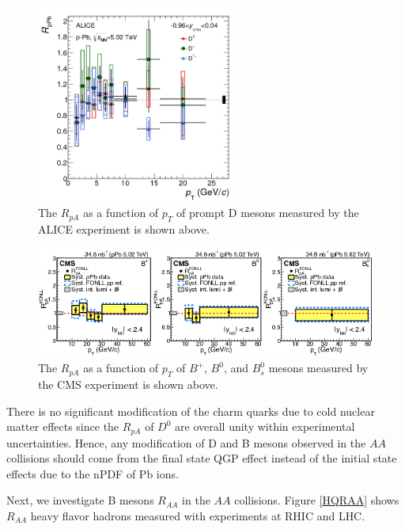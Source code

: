 \begin{figure}[hbtp]
\begin{center}
\includegraphics[width=0.60\textwidth]{Figures/Chapter2/ALICEDRpA.png}
\caption{The $R_{pA}$ as a function of $p_T$ of prompt D mesons measured by the ALICE experiment is shown above.}
\label{DRPA}
\end{center}
\end{figure}   

\begin{figure}[hbtp]
\begin{center}
\includegraphics[width=1.10\textwidth]{Figures/Chapter2/CMSDRpA.png}
\caption{The $R_{pA}$ as a function of $p_T$ of $B^+$, $B^0$, and $B^0_s$ mesons measured by the CMS experiment is shown above.}
\label{BRPA}
\end{center}
\end{figure}   

There is no significant modification of the charm quarks due to cold nuclear matter effects since the $R_{pA}$ of $D^0$ are overall unity within experimental uncertainties. Hence, any modification of D and B mesons observed in the $AA$ collisions should come from the final state QGP effect instead of the initial state effects due to the nPDF of Pb ions. 

Next, we investigate B mesons $R_{AA}$ in the $AA$ collisions. Figure \ref{HQRAA} shows $R_{AA}$ heavy flavor hadrons measured with experiments at RHIC and LHC.

